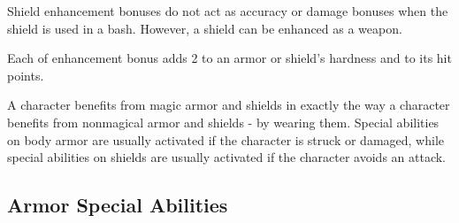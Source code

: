              Shield enhancement bonuses do not act as accuracy or damage bonuses when the shield is used in a bash.
            However, a shield can be enhanced as a weapon.

             Each  of enhancement bonus adds 2 to an armor or shield's hardness and  to its hit points.

             A character benefits from magic armor and shields in exactly the way a character benefits from nonmagical armor and shields - by wearing them.
            Special abilities on body armor are usually activated if the character is struck or damaged, while special abilities on shields are usually activated if the character avoids an attack.

    \subsection{Armor Special Abilities}\label{Armor Special Abilities}

